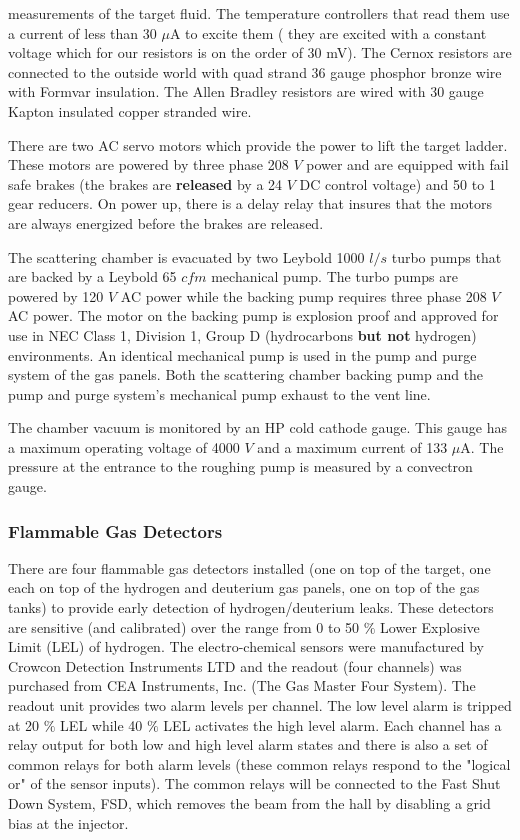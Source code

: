 {\begin{description}
measurements of the target fluid. The temperature controllers that
read them use a current of less than 30 $\mu$A to excite them (
they are excited with a constant voltage which for our resistors is
on the order of 30 mV). The Cernox resistors are connected to the outside world
with quad strand 36 gauge phosphor bronze wire with Formvar insulation.
The Allen Bradley resistors are wired with 30 gauge Kapton insulated 
copper stranded wire.
\item[{\bf Target Lifter}] There are two AC servo motors which provide
the power to lift the target ladder. These motors are powered by three
phase 208 $V$ power and are equipped with fail safe brakes (the brakes are
{\bf released} by a 24 $V$ DC control voltage)
and 50 to 1 gear reducers. On power up, there is a delay relay
that insures that
the motors are always energized before the brakes are released.
\item[{\bf Vacuum Pumps}] The scattering chamber is evacuated by two Leybold
1000 $l/s$ turbo pumps that are  backed by a Leybold 65 $cfm$
mechanical pump. The turbo pumps are powered by 120 $V$ AC power while the
backing pump requires three phase 208 $V$ AC power. The motor on the backing 
pump is explosion proof and approved for use in NEC Class 1, Division 1,
Group D (hydrocarbons {\bf but not} hydrogen) environments. An identical
mechanical pump is used in the pump and purge system of the gas panels.
Both the scattering chamber backing pump and the
pump and purge system's mechanical pump exhaust to the vent line. 
\item[{\bf Vacuum Gauges}] The chamber vacuum is monitored by an
HP cold cathode gauge. This gauge has a maximum operating voltage of 
4000 $V$ and a maximum
current of 133 $\mu$A. The pressure at the entrance to the roughing pump
is measured by a convectron gauge.
\end{description}

\subsubsection{ Flammable Gas Detectors}

There are four flammable gas detectors installed (one on top of the target,
one each on top of the hydrogen and deuterium gas panels, one on top of the gas
tanks)
to provide early detection
of hydrogen/deuterium leaks. These detectors are sensitive (and calibrated)
over the range from 0 to 50 $\%$ Lower Explosive Limit (LEL) of hydrogen.
The electro-chemical sensors were manufactured by Crowcon Detection
Instruments LTD and
the readout (four channels) was purchased from CEA Instruments, Inc. 
(The Gas Master Four System). The readout unit provides two alarm
levels per channel. The low level alarm is tripped at 20 $\%$ LEL
while 40 $\%$ LEL activates the high level alarm.
Each channel has a relay output for both low and high level alarm
states and there is also a set of common relays for both alarm
levels (these common relays respond to the "logical or" of the sensor inputs).
The common relays will be connected to the Fast Shut Down System, FSD,
which removes the beam from the hall by disabling a grid bias at the
injector.

}
